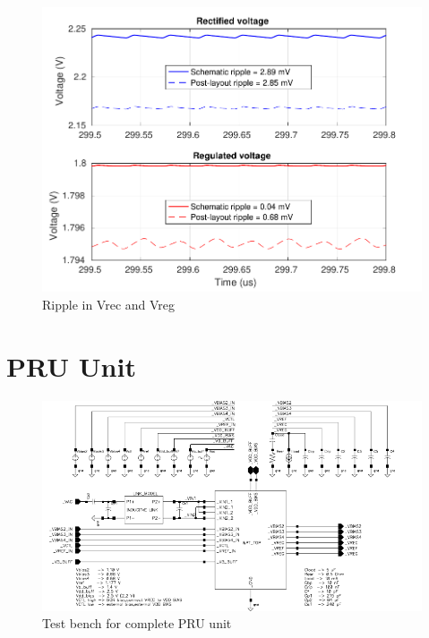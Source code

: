 \documentclass[12pt,a4paper,UKenglish]{article}
\begin{document}
\begin{figure} [H]
  \centering
  \includegraphics[width=\textwidth]{img/wpt_ripple_wo_bgr_both.pdf} 
 \caption{Ripple in Vrec and Vreg} 
\label{fig:wpt_ripple_wo} 
\end{figure}

\section{PRU Unit}

\begin{figure} [H]
  \centering
  \includegraphics[width=\textwidth]{img/wpt_top_link.pdf} 
 \caption{Test bench for complete PRU unit } 
\label{fig:wpt_top_link} 
\end{figure}

\clearpage
\newpage
\nocite{*}
\printbibliography

\newpage
\listoffigures

\newpage
\listoftables

\newpage
\printnoidxglossaries
\end{document}
